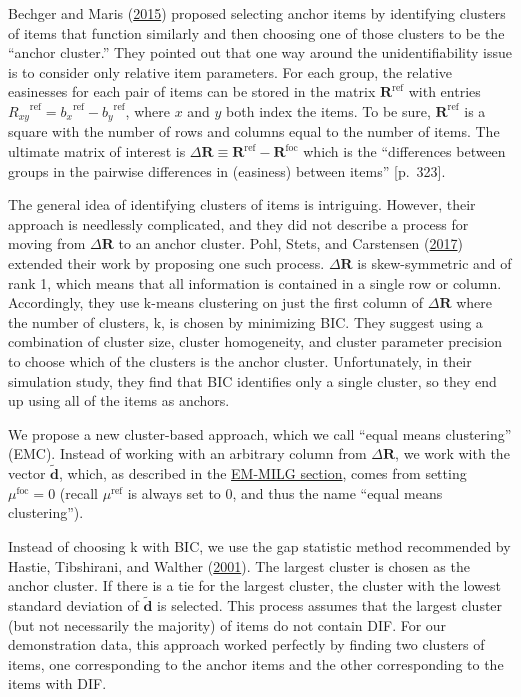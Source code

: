 \documentclass[
  11pt,
]{article}
\begin{document}
Bechger and Maris (\protect\hyperlink{ref-bechger2015statistical}{2015}) proposed selecting anchor items by identifying clusters of items that function similarly and then choosing one of those clusters to be the \enquote{anchor cluster.} They pointed out that one way around the unidentifiability issue is to consider only relative item parameters. For each group, the relative easinesses for each pair of items can be stored in the matrix \(\mathbf{R}^{\text{ref}}\) with entries \({R_{xy}}^{\text{ref}} = {b_x}^{\text{ref}} - {b_y}^{\text{ref}}\), where \(x\) and \(y\) both index the items. To be sure, \(\mathbf{R}^{\text{ref}}\) is a square with the number of rows and columns equal to the number of items. The ultimate matrix of interest is \(\Delta \mathbf{R} \equiv \mathbf{R}^{\text{ref}}-\mathbf{R}^{\text{foc}}\) which is the \enquote{differences between groups in the pairwise differences in (easiness) between items} {[}p.~323{]}.

The general idea of identifying clusters of items is intriguing. However, their approach is needlessly complicated, and they did not describe a process for moving from \(\Delta \mathbf{R}\) to an anchor cluster. Pohl, Stets, and Carstensen (\protect\hyperlink{ref-pohl2017cluster}{2017}) extended their work by proposing one such process. \(\Delta \mathbf{R}\) is skew-symmetric and of rank 1, which means that all information is contained in a single row or column. Accordingly, they use k-means clustering on just the first column of \(\Delta \mathbf{R}\) where the number of clusters, k, is chosen by minimizing BIC. They suggest using a combination of cluster size, cluster homogeneity, and cluster parameter precision to choose which of the clusters is the anchor cluster. Unfortunately, in their simulation study, they find that BIC identifies only a single cluster, so they end up using all of the items as anchors.

We propose a new cluster-based approach, which we call \enquote{equal means clustering} (EMC). Instead of working with an arbitrary column from \(\Delta \mathbf{R}\), we work with the vector \(\tilde{\mathbf{d}}\), which, as described in the \protect\hyperlink{emmilg}{EM-MILG section}, comes from setting \(\mu^\text{foc} = 0\) (recall \(\mu^\text{ref}\) is always set to \(0\), and thus the name \enquote{equal means clustering}).

Instead of choosing k with BIC, we use the gap statistic method recommended by Hastie, Tibshirani, and Walther (\protect\hyperlink{ref-hastie2001estimating}{2001}). The largest cluster is chosen as the anchor cluster. If there is a tie for the largest cluster, the cluster with the lowest standard deviation of \(\tilde{\mathbf{d}}\) is selected. This process assumes that the largest cluster (but not necessarily the majority) of items do not contain DIF. For our demonstration data, this approach worked perfectly by finding two clusters of items, one corresponding to the anchor items and the other corresponding to the items with DIF.
\end{document}
